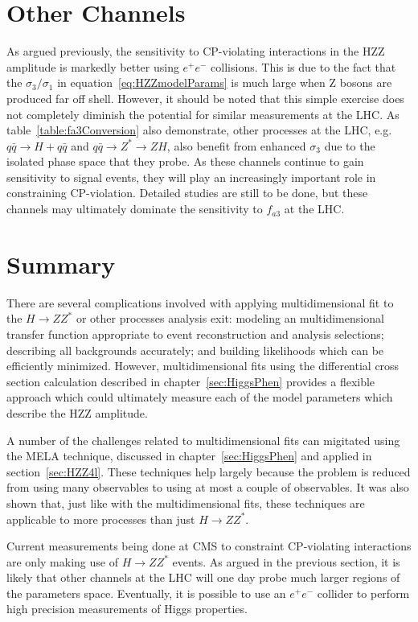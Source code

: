 \section{Other Channels}

As argued previously, the sensitivity to CP-violating 
interactions in the 
HZZ amplitude is markedly better using $e^+e^-$ collisions. 
This is due to the fact that the $\sigma_3/\sigma_1$ in 
equation~\ref{eq:HZZmodelParams} is much large when Z bosons
are produced far off shell.
However, it should be noted that this simple exercise does not
completely diminish the potential for similar measurements at 
the LHC.  As table~\ref{table:fa3Conversion} also demonstrate,
other processes at the LHC, 
e.g. $q\bar{q}\to H + q\bar{q}$ and $q\bar{q}\to Z^* \to ZH$,
also benefit from enhanced $\sigma_3$
due to the isolated phase space that they probe.  As these channels 
continue to gain sensitivity to signal events, they will play an
increasingly important role in constraining CP-violation.
Detailed studies are still to be done, but these channels may
ultimately dominate the sensitivity to $f_{a3}$ at the LHC.  

\section{Summary}

There are several complications involved with applying
multidimensional fit to the $H\to ZZ^*$ or other processes
analysis exit:
modeling an multidimensional transfer function appropriate
to event reconstruction and analysis selections; describing all 
backgrounds accurately; and building likelihoods which can be
efficiently minimized. However, multidimensional fits using the
differential cross section calculation described in
chapter~\ref{sec:HiggsPhen} provides a flexible approach which
could ultimately measure each of the model parameters which 
describe the HZZ amplitude.  

A number of the challenges related to multidimensional fits
can migitated using the MELA
technique, discussed in chapter~\ref{sec:HiggsPhen} and applied
in section~\ref{sec:HZZ4l}.  These techniques
help largely because the problem is reduced from using
many observables to using at most a couple of observables.  It
was also shown that, just like with the multidimensional fits,
these techniques are applicable to more processes than just 
$H\to ZZ^*$.  

Current measurements being done at CMS to constraint 
CP-violating interactions are only making use of $H\to ZZ^*$
events.  As argued in the previous section, it is
likely that other channels at the LHC will one day probe much
larger regions of the parameters space.  Eventually, it is 
possible to use an $e^+e^-$ collider to perform high precision
measurements of Higgs properties. 

